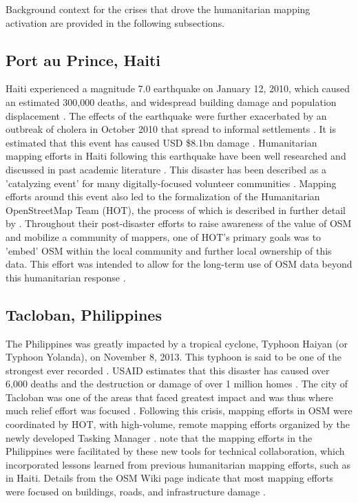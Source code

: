 Background context for the crises that drove the humanitarian mapping activation are provided in the following subsections.

\subsection{Port au Prince, Haiti}

Haiti experienced a magnitude 7.0 earthquake on January 12, 2010, which caused an estimated 300,000 deaths, and widespread building damage and population displacement \parencite{desroches_overview_2011}. The effects of the earthquake were further exacerbated by an outbreak of cholera in October 2010 that spread to informal settlements \parencite{noauthor_world_2011}. It is estimated that this event has caused USD \$8.1bn damage \parencite{cavallo_estimating_2010}. Humanitarian mapping efforts in Haiti following this earthquake have been well researched and discussed in past academic literature \parencite{zook_volunteered_2010, soden_crowdsourced_2014, palen_success_2015, meier_crisis_2012}. This disaster has been described as a 'catalyzing event' for many digitally-focused volunteer communities \parencite[p. 314]{soden_crowdsourced_2014}. Mapping efforts around this event also led to the formalization of the Humanitarian OpenStreetMap Team (HOT), the process of which is described in further detail by \textcite{soden_crowdsourced_2014}. Throughout their post-disaster efforts to raise awareness of the value of OSM and mobilize a community of mappers, one of HOT's primary goals was to 'embed' OSM within the local community and further local ownership of this data. This effort was intended to allow for the long-term use of OSM data beyond this humanitarian response \parencite{soden_crowdsourced_2014}.

\subsection{Tacloban, Philippines}

The Philippines was greatly impacted by a tropical cyclone, Typhoon Haiyan (or Typhoon Yolanda), on November 8, 2013. This typhoon is said to be one of the strongest ever recorded \parencite{lum_typhoon_2014}. USAID estimates that this disaster has caused over 6,000 deaths and the destruction or damage of over 1 million homes \parencite{noauthor_typhoon_2014}. The city of Tacloban was one of the areas that faced greatest impact and was thus where much relief effort was focused \parencite{lum_typhoon_2014}. Following this crisis, mapping efforts in OSM were coordinated by HOT, with high-volume, remote mapping efforts organized by the newly developed Tasking Manager \parencite{noauthor_wikiproject_2018}. \textcite{palen_success_2015} note that the mapping efforts in the Philippines were facilitated by these new tools for technical collaboration, which incorporated lessons learned from previous humanitarian mapping efforts, such as in Haiti. Details from the OSM Wiki page indicate that most mapping efforts were focused on buildings, roads, and infrastructure damage \parencite{noauthor_wikiproject_2018}. 

